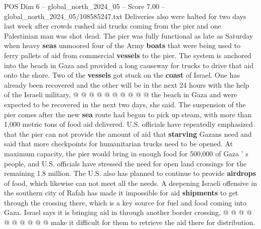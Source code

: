 \begin{textsample}{POS Dim 6 – global\_north\_2024\_05 – Score 7.00 – global\_north\_2024\_05/108585247.txt}
Deliveries also were halted for two days last week after crowds rushed aid trucks coming from the pier and one Palestinian man was shot dead.
The pier was fully functional as late as Saturday when heavy \textbf{seas} unmoored four of the Army \textbf{boats} that were being used to ferry pallets of aid from commercial \textbf{vessels} to the pier.
The system is anchored into the beach in Gaza and provided a long causeway for trucks to drive that aid onto the shore.
Two of the \textbf{vessels} got stuck on the \textbf{coast} of Israel.
One has already been recovered and the other will be in the next 24 hours with the help of the Israeli military, @ @ @ @ @ @ @ @ @ @ the beach in Gaza and were expected to be recovered in the next two days, she said.
The suspension of the pier comes after the new \textbf{sea} route had begun to pick up steam, with more than 1,000 metric tons of food aid delivered.
U.S. officials have repeatedly emphasized that the pier can not provide the amount of aid that \textbf{starving} Gazans need and said that more checkpoints for humanitarian trucks need to be opened.
At maximum capacity, the pier would bring in enough food for 500,000 of Gaza ' s people, and U.S. officials have stressed the need for open land crossings for the remaining 1.8 million.
The U.S. also has planned to continue to provide \textbf{airdrops} of food, which likewise can not meet all the needs.
A deepening Israeli offensive in the southern city of Rafah has made it impossible for aid \textbf{shipments} to get through the crossing there, which is a key source for fuel and food coming into Gaza.
Israel says it is bringing aid in through another border crossing, @ @ @ @ @ @ @ @ @ @ make it difficult for them to retrieve the aid there for distribution.

\end{textsample}
